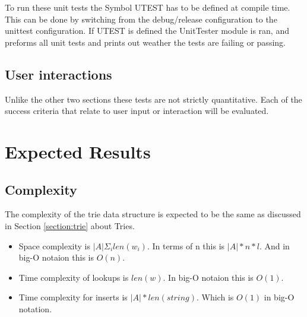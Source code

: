 \documentclass[10pt]{article} %
\begin{document}
		    To run these unit tests the Symbol UTEST has to be defined at compile time. This can be done by switching from the debug/release configuration to the unittest configuration. If UTEST is defined the UnitTester module is ran, and preforms all unit tests and prints out weather the tests are failing or passing. 
			     
		\subsection{User interactions}
			Unlike the other two sections these tests are not strictly quantitative. Each of the success criteria that relate to user input or interaction will be evaluated. 
	\section{Expected Results}
		\subsection{Complexity}
		The complexity of the trie data structure is expected to be the same as discussed in Section \ref{section:trie} about Tries.
		
    		\begin{itemize}
    		    \item Space complexity is \begin{math} \vert A \vert \Sigma_i len(w_i)\end{math}. In terms of n this is \begin{math} \vert A \vert * n * l \end{math}. And in big-O notaion this is \begin{math} O(n) \end{math}.
    		    
    		    \item Time complexity of lookups is \begin{math}len(w)\end{math}. In big-O notaion this is \begin{math} O(1) \end{math}.
    		    
    		    \item Time complexity for inserts is \begin{math}\vert A \vert  * len(string)\end{math}. Which is \begin{math} O(1) \end{math} in big-O notation.

    		\end{itemize}
		
\end{document}
